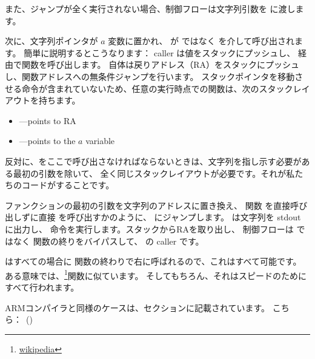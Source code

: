 また、ジャンプが全く実行されない場合、制御フローは文字列引数を \printf に渡します。

\label{jump_to_last_printf}
\myindex{\Stack}

次に、文字列ポインタが $a$ 変数に置かれ、 \printf が \CALL ではなく \JMP を介して呼び出されます。 
簡単に説明するとこうなります：
\gls{caller} は値をスタックにプッシュし、 \CALL 経由で関数を呼び出します。
\CALL 自体は戻りアドレス（\ac{RA}）をスタックにプッシュし、関数アドレスへの無条件ジャンプを行います。
スタックポインタを移動させる命令が含まれていないため、任意の実行時点での関数は、次のスタックレイアウトを持ちます。

\begin{itemize}
\item\ESP---points to \ac{RA}
\item{}---points to the $a$ variable 
\end{itemize}

反対に、\printf をここで呼び出さなければならないときは、文字列を指し示す必要がある最初の\printf 引数を除いて、
全く同じスタックレイアウトが必要です。それが私たちのコードがすることです。

ファンクションの最初の引数を文字列のアドレスに置き換え、
関数 \ttf を直接呼び出しずに直接 \printf を呼び出すかのように、 \printf にジャンプします。
\printf は文字列を \gls{stdout} に出力し、 \RET 命令を実行します。スタックから\ac{RA}を取り出し、
制御フローは \ttf ではなく \ttf 関数の終りをバイパスして、 \ttf の \gls{caller} です。

\newcommand{\URLSJ}{\href{http://go.yurichev.com/17121}{wikipedia}}

\printf はすべての場合に  \ttf 関数の終わりで右に呼ばれるので、これはすべて可能です。
ある意味では、\footnote{\URLSJ}関数に似ています。
そしてもちろん、それはスピードのためにすべて行われます。

ARMコンパイラと同様のケースは、\q{\PrintfSeveralArgumentsSectionName}セクションに記載されています。
こちら：~()



